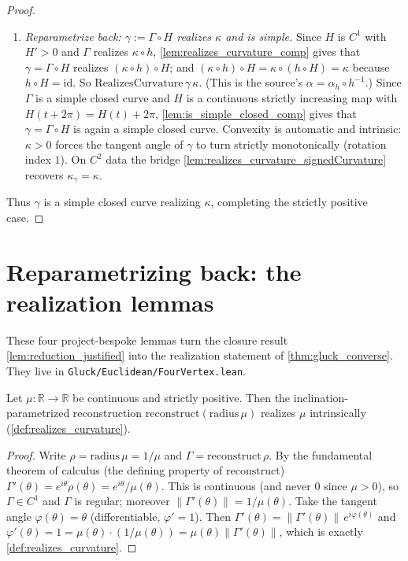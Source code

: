 \begin{proof}
\begin{enumerate}
    \item \emph{Reparametrize back: $\gamma:=\Gamma\circ H$ realizes $\kappa$ and is
      simple.} Since $H$ is $C^1$ with $H'>0$ and $\Gamma$ realizes $\kappa\circ h$,
      \cref{lem:realizes_curvature_comp} gives that $\gamma=\Gamma\circ H$ realizes
      $(\kappa\circ h)\circ H$; and $(\kappa\circ h)\circ H = \kappa\circ(h\circ H)
      = \kappa$ because $h\circ H=\mathrm{id}$. So $\mathrm{RealizesCurvature}\,
      \gamma\,\kappa$. (This is the source's $\alpha=\alpha_h\circ h^{-1}$.) Since
      $\Gamma$ is a simple closed curve and $H$ is a continuous strictly increasing
      map with $H(t+2\pi)=H(t)+2\pi$, \cref{lem:is_simple_closed_comp} gives that
      $\gamma=\Gamma\circ H$ is again a simple closed curve. Convexity is automatic
      and intrinsic: $\kappa>0$ forces the tangent angle of $\gamma$ to turn
      strictly monotonically (rotation index $1$). On $C^2$ data the bridge
      \cref{lem:realizes_curvature_signedCurvature} recovers $\kappa_\gamma=\kappa$.
  \end{enumerate}
  Thus $\gamma$ is a simple closed curve realizing $\kappa$, completing the
  strictly positive case.
\end{proof}

\section{Reparametrizing back: the realization lemmas}

These four project-bespoke lemmas turn the closure result
\cref{lem:reduction_justified} into the realization statement of
\cref{thm:gluck_converse}. They live in \texttt{Gluck/Euclidean/FourVertex.lean}.

\begin{lemma}
  \label{lem:realizes_curvature_reconstruct}
  Let $\mu:\mathbb{R}\to\mathbb{R}$ be continuous and strictly positive. Then the
  inclination-parametrized reconstruction $\mathrm{reconstruct}(\mathrm{radius}\,
  \mu)$ realizes $\mu$ intrinsically (\cref{def:realizes_curvature}).
\end{lemma}
\begin{proof}
  \leanok
  Write $\rho=\mathrm{radius}\,\mu=1/\mu$ and $\Gamma=\mathrm{reconstruct}\,\rho$.
  By the fundamental theorem of calculus (the defining property of
  $\mathrm{reconstruct}$) $\Gamma'(\theta)=e^{i\theta}\rho(\theta)=
  e^{i\theta}/\mu(\theta)$. This is continuous (and never $0$ since
  $\mu>0$), so $\Gamma\in C^1$ and $\Gamma$ is regular; moreover
  $\lVert\Gamma'(\theta)\rVert=1/\mu(\theta)$. Take the tangent angle
  $\varphi(\theta)=\theta$ (differentiable, $\varphi'=1$). Then
  $\Gamma'(\theta)=\lVert\Gamma'(\theta)\rVert\,e^{i\varphi(\theta)}$ and
  $\varphi'(\theta)=1=\mu(\theta)\cdot(1/\mu(\theta))=
  \mu(\theta)\lVert\Gamma'(\theta)\rVert$, which is exactly
  \cref{def:realizes_curvature}.
\end{proof}

